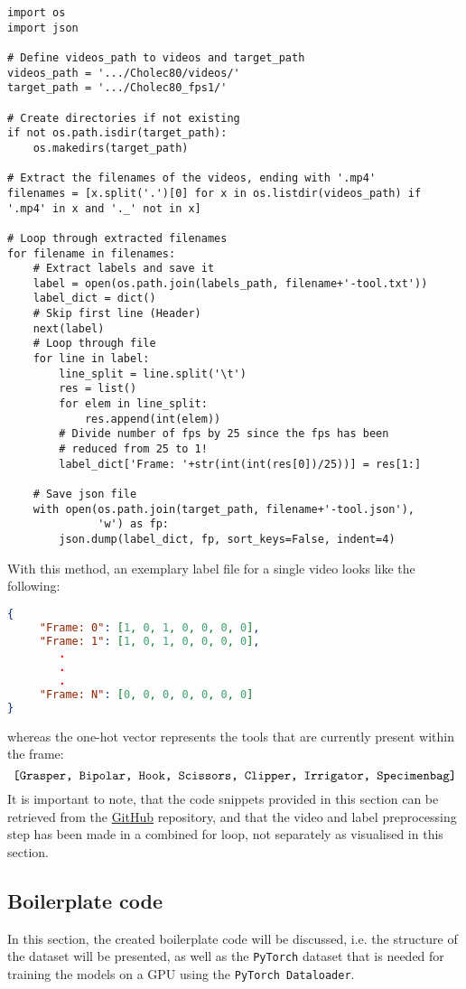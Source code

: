 \documentclass{article}
\begin{document}
\begin{verbatim}
import os
import json

# Define videos_path to videos and target_path
videos_path = '.../Cholec80/videos/'
target_path = '.../Cholec80_fps1/'

# Create directories if not existing
if not os.path.isdir(target_path):
    os.makedirs(target_path)
        
# Extract the filenames of the videos, ending with '.mp4'
filenames = [x.split('.')[0] for x in os.listdir(videos_path) if
'.mp4' in x and '._' not in x]

# Loop through extracted filenames
for filename in filenames:
    # Extract labels and save it
    label = open(os.path.join(labels_path, filename+'-tool.txt'))
    label_dict = dict()
    # Skip first line (Header)
    next(label)
    # Loop through file
    for line in label:
        line_split = line.split('\t')
        res = list()
        for elem in line_split:
            res.append(int(elem))
        # Divide number of fps by 25 since the fps has been 
        # reduced from 25 to 1!
        label_dict['Frame: '+str(int(int(res[0])/25))] = res[1:]
    
    # Save json file
    with open(os.path.join(target_path, filename+'-tool.json'),
              'w') as fp:
        json.dump(label_dict, fp, sort_keys=False, indent=4)
\end{verbatim}

\noindent
With this method, an exemplary label file for a single video looks like the following:
\begin{lstlisting}[language=json,firstnumber=1]
{
     "Frame: 0": [1, 0, 1, 0, 0, 0, 0],
     "Frame: 1": [1, 0, 1, 0, 0, 0, 0],
        .
        .
        .
     "Frame: N": [0, 0, 0, 0, 0, 0, 0]
}
\end{lstlisting}
whereas the one-hot vector represents the tools that are currently present within the frame:
\[ \text{\texttt{[Grasper, Bipolar, Hook, Scissors, Clipper, Irrigator, Specimenbag]}} \]
\noindent
It is important to note, that the code snippets provided in this section can be retrieved from the \href{https://github.com/amrane99/CAI-Classification/tree/main}{GitHub} repository, and that the video and label preprocessing step has been made in a combined for loop, not separately as visualised in this section.

\subsection{Boilerplate code}
In this section, the created boilerplate code will be discussed, i.e. the structure of the dataset will be presented, as well as the \texttt{PyTorch} dataset that is needed for training the models on a GPU using the \texttt{PyTorch Dataloader}.
\end{document}
